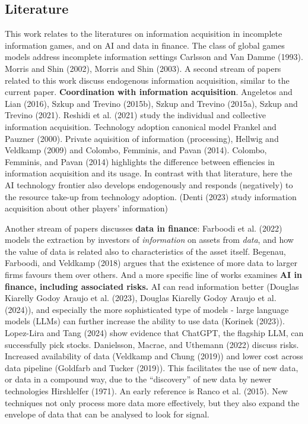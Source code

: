 \documentclass[
]{article}
\theoremstyle{plain}
\theoremstyle{definition}
\theoremstyle{remark}
\begin{document}
\subsection{Literature}\label{literature}

This work relates to the literatures on information acquisition in
incomplete information games, and on AI and data in finance. The class
of global games models address incomplete information settings Carlsson
and Van Damme (1993). Morris and Shin (2002), Morris and Shin (2003). A
second stream of papers related to this work discuss endogenous
information acquisition, similar to the current paper.
\textbf{Coordination with information acquisition}. Angeletos and Lian
(2016), Szkup and Trevino (2015b), Szkup and Trevino (2015a), Szkup and
Trevino (2021). Reshidi et al. (2021) study the individual and
collective information acquisition. Technology adoption canonical model
Frankel and Pauzner (2000). Private aquisition of information
(processing), Hellwig and Veldkamp (2009) and Colombo, Femminis, and
Pavan (2014). Colombo, Femminis, and Pavan (2014) highlights the
difference between effiencies in information acquisition and its usage.
In contrast with that literature, here the AI technology frontier also
develops endogenously and responds (negatively) to the resource take-up
from technology adoption. (Denti (2023) study information acquisition
about other players' information)

Another stream of papers discusses \textbf{data in finance}: Farboodi et
al. (2022) models the extraction by investors of \emph{information} on
assets from \emph{data}, and how the value of data is related also to
characteristics of the asset itself. Begenau, Farboodi, and Veldkamp
(2018) argues that the existence of more data to larger firms favours
them over others. And a more specific line of works examines \textbf{AI
in finance, including associated risks.} AI can read information better
(Douglas Kiarelly Godoy Araujo et al. (2023), Douglas Kiarelly Godoy
Araujo et al. (2024)), and especially the more sophisticated type of
models - large language models (LLMs) can further increase the ability
to use data (Korinek (2023)). Lopez-Lira and Tang (2024) show evidence
that ChatGPT, the flagship LLM, can successfully pick stocks.
Danielsson, Macrae, and Uthemann (2022) discuss risks. Increased
availability of data (Veldkamp and Chung (2019)) and lower cost across
data pipeline (Goldfarb and Tucker (2019)). This facilitates the use of
new data, or data in a compound way, due to the ``discovery'' of new
data by newer technologies Hirshlelfer (1971). An early reference is
Ranco et al. (2015). New techniques not only process more data more
effectively, but they also expand the envelope of data that can be
analysed to look for signal.
\end{document}
